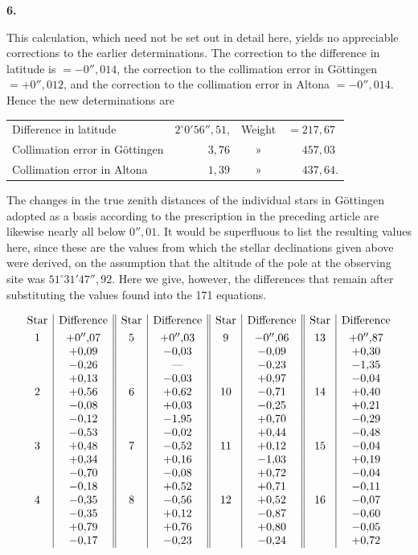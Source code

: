 \begin{center}\textbf{6.}\end{center}

This calculation, which need not be set out in detail here, yields no
appreciable corrections to the earlier determinations. The correction to
the difference in latitude is \(=-0''{,}014\),
the correction to the collimation error in Göttingen \(=+0''{,}012\), and the
correction to the collimation error in Altona \(=-0''{,}014\). Hence the new
determinations are
\begin{center}
\begin{tabular}{@{}l@{\quad}r@{\enspace}c@{\enspace}l@{}}
Difference in latitude & \(2^\circ0'56''{,}51\), & Weight & \(=217{,}67\)\\
Collimation error in Göttingen & \(3{,}76\) & » & \(\phantom{=}457{,}03\)\\
Collimation error in Altona & \(1{,}39\) & » & \(\phantom{=}437{,}64\).
\end{tabular}
\end{center}

The changes in the true zenith distances of the individual stars in Göttingen
adopted as a basis according to the prescription in the preceding article
are likewise nearly all below \(0''{,}01\). It would be superfluous to list the
resulting values here, since these are the values from which the stellar
declinations given above were derived, on the assumption that the altitude of the
pole at the observing site was \(51^\circ31'47''{,}92\). Here we give, however, the differences
that remain after substituting the values found into the
171 equations.

{\small
\[
\begin{array}{@{}c|c||c|c||c|c||c|c@{}}
\text{Star}&\text{Difference}&\text{Star}&\text{Difference}&
\text{Star}&\text{Difference}&\text{Star}&\text{Difference}\\[.8ex]
1&+0''{,}07&5&+0''{,}03&9&-0''{,}06&13&+0''{,}87\\
&+0{,}09&&-0{,}03&&-0{,}09&&+0{,}30\\
&-0{,}26&&\text{—}&&-0{,}23&&-1{,}35\\
&+0{,}13&&-0{,}03&&+0{,}97&&-0{,}04\\
2&+0{,}56&6&+0{,}62&10&-0{,}71&14&+0{,}40\\
&-0{,}08&&+0{,}03&&-0{,}25&&+0{,}21\\
&-0{,}12&&-1{,}95&&+0{,}70&&-0{,}29\\
&-0{,}53&&-0{,}02&&+0{,}44&&-0{,}48\\
3&+0{,}48&7&-0{,}52&11&+0{,}12&15&-0{,}04\\
&+0{,}34&&+0{,}16&&-1{,}03&&+0{,}19\\
&-0{,}70&&-0{,}08&&+0{,}72&&-0{,}04\\
&-0{,}18&&+0{,}52&&+0{,}71&&-0{,}11\\
4&-0{,}35&8&-0{,}56&12&+0{,}52&16&-0{,}07\\
&-0{,}35&&+0{,}12&&-0{,}87&&-0{,}60\\
&+0{,}79&&+0{,}76&&+0{,}80&&-0{,}05\\
&-0{,}17&&-0{,}23&&-0{,}24&&+0{,}72
\end{array}
\]
\par
}

